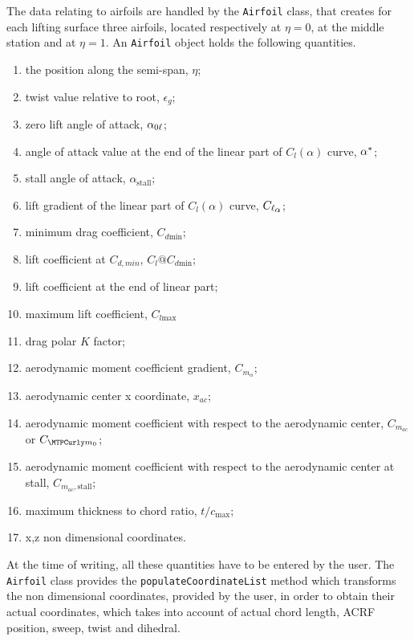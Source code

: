 \bigskip
\noindent
The data relating to airfoils are handled by the \lstinline[language=Java]!Airfoil! class, that creates for each lifting surface three airfoils, located respectively at $\eta=0$, at the middle station and at $\eta=1$. An \lstinline[language=Java]!Airfoil! object holds the following quantities.
%
\begin{enumerate}
	\item the position along the semi-span, $\eta$;
	\item twist value relative to root, $\epsilon_g$;
	\item zero lift angle of attack, $\alpha_{{0\ell}}$;
	\item angle of attack value at the end of the linear part of $C_l(\alpha)$ curve, $\alpha^*$;
	\item stall angle of attack, $\alpha_{\text{stall}}$;
	\item lift gradient of the linear part of $C_l(\alpha)$ curve, $\Clalphap$;
	\item minimum drag coefficient, $C_{d\text{min}}$;
	\item lift coefficient at $C_{d,min}$, $C_l@C_{d\text{min}}$;
	\item lift coefficient at the end of linear part;
	\item maximum lift coefficient, $C_{l\text{max}}$
	\item drag polar $K$ factor;
	\item aerodynamic moment coefficient gradient, $C_{m_\alpha}$;
	\item aerodynamic center x coordinate, $x_{ac}$;
	\item aerodynamic moment coefficient with respect to the aerodynamic center, $C_{m_{ac}}$ or $\Cmzerop$;
	\item aerodynamic moment coefficient with respect to the aerodynamic center at stall, $C_{m_{ac},\text{stall}}$;
	\item maximum thickness to chord ratio, $t/c_{\text{max}}$;
	\item x,z non dimensional coordinates.
\end{enumerate}
%
At the time of writing, all these quantities have to be entered by the user. The \lstinline[language=Java]!Airfoil! class provides the \lstinline[language=Java]!populateCoordinateList! method which transforms the non dimensional coordinates, provided by the user, in order to obtain their actual coordinates, which takes into account of actual chord length, \gls{ACRF} position, sweep, twist and dihedral.

